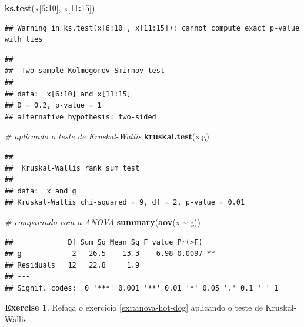 \documentclass[
]{book}
\newenvironment{Shaded}{\begin{snugshade}}{\end{snugshade}}
\newcommand{\CommentTok}[1]{\textcolor[rgb]{0.56,0.35,0.01}{\textit{#1}}}
\newcommand{\DecValTok}[1]{\textcolor[rgb]{0.00,0.00,0.81}{#1}}
\newcommand{\KeywordTok}[1]{\textcolor[rgb]{0.13,0.29,0.53}{\textbf{#1}}}
\newcommand{\NormalTok}[1]{#1}
\newcommand{\OperatorTok}[1]{\textcolor[rgb]{0.81,0.36,0.00}{\textbf{#1}}}
\newcommand{\StringTok}[1]{\textcolor[rgb]{0.31,0.60,0.02}{#1}}
\theoremstyle{definition}
\theoremstyle{definition}
\theoremstyle{definition}
\newtheorem{exercise}{Exercise}[chapter]
\theoremstyle{remark}
\begin{document}
\begin{Shaded}
\begin{Highlighting}[]
\KeywordTok{ks.test}\NormalTok{(x[}\DecValTok{6}\OperatorTok{:}\DecValTok{10}\NormalTok{], x[}\DecValTok{11}\OperatorTok{:}\DecValTok{15}\NormalTok{])}
\end{Highlighting}
\end{Shaded}

\begin{verbatim}
## Warning in ks.test(x[6:10], x[11:15]): cannot compute exact p-value with ties
\end{verbatim}

\begin{verbatim}
## 
##  Two-sample Kolmogorov-Smirnov test
## 
## data:  x[6:10] and x[11:15]
## D = 0.2, p-value = 1
## alternative hypothesis: two-sided
\end{verbatim}

\begin{Shaded}
\begin{Highlighting}[]
\CommentTok{\# aplicando o teste de Kruskal{-}Wallis}
\KeywordTok{kruskal.test}\NormalTok{(x,g)}
\end{Highlighting}
\end{Shaded}

\begin{verbatim}
## 
##  Kruskal-Wallis rank sum test
## 
## data:  x and g
## Kruskal-Wallis chi-squared = 9, df = 2, p-value = 0.01
\end{verbatim}

\begin{Shaded}
\begin{Highlighting}[]
\CommentTok{\# comparando com a ANOVA}
\KeywordTok{summary}\NormalTok{(}\KeywordTok{aov}\NormalTok{(x }\OperatorTok{\textasciitilde{}}\StringTok{ }\NormalTok{g))}
\end{Highlighting}
\end{Shaded}

\begin{verbatim}
##             Df Sum Sq Mean Sq F value Pr(>F)   
## g            2   26.5    13.3    6.98 0.0097 **
## Residuals   12   22.8     1.9                  
## ---
## Signif. codes:  0 '***' 0.001 '**' 0.01 '*' 0.05 '.' 0.1 ' ' 1
\end{verbatim}

\begin{exercise}
\protect\hypertarget{exr:kw-hot-dog}{}{\label{exr:kw-hot-dog} }Refaça o exercício \ref{exr:anova-hot-dog} aplicando o teste de Kruskal-Wallis.
\end{exercise}
\end{document}
